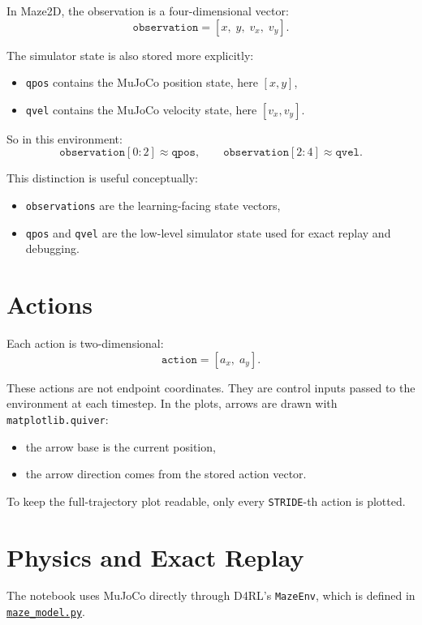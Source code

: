 \documentclass[12pt]{article}
\begin{document}
In Maze2D, the observation is a four-dimensional vector:
\[
\texttt{observation} = [x,\; y,\; v_x,\; v_y].
\]

The simulator state is also stored more explicitly:

\begin{itemize}[leftmargin=*]
\item \texttt{qpos} contains the MuJoCo position state, here \([x,y]\),
\item \texttt{qvel} contains the MuJoCo velocity state, here \([v_x,v_y]\).
\end{itemize}

So in this environment:
\[
\texttt{observation}[0:2] \approx \texttt{qpos},
\qquad
\texttt{observation}[2:4] \approx \texttt{qvel}.
\]

This distinction is useful conceptually:

\begin{itemize}[leftmargin=*]
\item \texttt{observations} are the learning-facing state vectors,
\item \texttt{qpos} and \texttt{qvel} are the low-level simulator state used for exact replay and debugging.
\end{itemize}

\section*{Actions}

Each action is two-dimensional:
\[
\texttt{action} = [a_x,\; a_y].
\]

These actions are not endpoint coordinates. They are control inputs passed to the environment at each timestep. In the plots, arrows are drawn with \texttt{matplotlib.quiver}:

\begin{itemize}[leftmargin=*]
\item the arrow base is the current position,
\item the arrow direction comes from the stored action vector.
\end{itemize}

To keep the full-trajectory plot readable, only every \texttt{STRIDE}-th action is plotted.

\section*{Physics and Exact Replay}

The notebook uses MuJoCo directly through D4RL's \texttt{MazeEnv}, which is defined in
\href{./d4rl/d4rl/pointmaze/maze_model.py}{\texttt{maze\_model.py}}.
\end{document}
